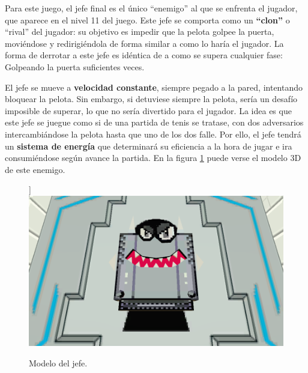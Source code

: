 Para este juego, el jefe final es el único ``enemigo'' al que se enfrenta el jugador, que aparece en el nivel 11 del juego. Este jefe se comporta como un \textbf{``clon''} o ``rival'' del jugador: su objetivo es impedir que la pelota golpee la puerta, moviéndose y redirigiéndola de forma similar a como lo haría el jugador. La forma de derrotar a este jefe es idéntica de a como se supera cualquier fase: Golpeando la puerta suficientes veces. 

El jefe se mueve a \textbf{velocidad constante}, siempre pegado a la pared, intentando bloquear la pelota. Sin embargo, si detuviese siempre la pelota, sería un desafío imposible de superar, lo que no sería divertido para el jugador. La idea es que este jefe se juegue como si de una partida de tenis se tratase, con dos adversarios intercambiándose la pelota hasta que uno de los dos falle. Por ello, el jefe tendrá un \textbf{sistema de energía} que determinará su eficiencia a la hora de jugar e ira consumiéndose según avance la partida. En la figura \ref{boss} puede verse el modelo 3D de este enemigo.
\begin{figure}[!t]]
	\includegraphics[width=1\textwidth]{images/estructura/jefe/boss-captura}
	\centering
	\caption{Modelo del jefe.}
	\label{boss}
\end{figure}

